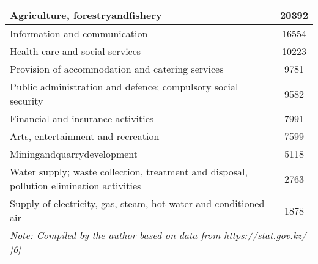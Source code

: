 \begin{table}[H]
\begin{tabular}{|lc|}
\multicolumn{1}{|p{0.7\textwidth}|}{Agriculture, forestryandfishery}                                                          & 20392                                    \\ \hline
\multicolumn{1}{|p{0.7\textwidth}|}{Information and communication}                                                            & 16554                                    \\ \hline
\multicolumn{1}{|p{0.7\textwidth}|}{Health care and social services}                                                          & 10223                                    \\ \hline
\multicolumn{1}{|p{0.7\textwidth}|}{Provision of accommodation and catering services}                                         & 9781                                     \\ \hline
\multicolumn{1}{|p{0.7\textwidth}|}{Public administration and defence; compulsory social security}                            & 9582                                     \\ \hline
\multicolumn{1}{|p{0.7\textwidth}|}{Financial and insurance activities}                                                       & 7991                                     \\ \hline
\multicolumn{1}{|p{0.7\textwidth}|}{Arts, entertainment and recreation}                                                       & 7599                                     \\ \hline
\multicolumn{1}{|p{0.7\textwidth}|}{Miningandquarrydevelopment}                                                               & 5118                                     \\ \hline
\multicolumn{1}{|p{0.7\textwidth}|}{Water supply; waste collection, treatment and disposal, pollution elimination activities} & 2763                                     \\ \hline
\multicolumn{1}{|p{0.7\textwidth}|}{Supply of electricity, gas, steam, hot water and conditioned air}                         & 1878                                     \\ \hline
\multicolumn{2}{|p{0.7\textwidth}|}{\textit{Note: Compiled by the author based on data from https://stat.gov.kz/ {[}6{]}}}                                               \\ \hline
\end{tabular}
\end{table}

